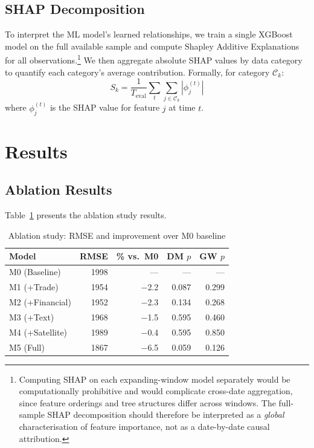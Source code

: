 \subsection{SHAP Decomposition}

To interpret the ML model's learned relationships, we train a single XGBoost model on the full available sample and compute Shapley Additive Explanations \citep{lundberg2017unified} for all observations.\footnote{Computing SHAP on each expanding-window model separately would be computationally prohibitive and would complicate cross-date aggregation, since feature orderings and tree structures differ across windows.  The full-sample SHAP decomposition should therefore be interpreted as a \emph{global} characterisation of feature importance, not as a date-by-date causal attribution.}  We then aggregate absolute SHAP values by data category to quantify each category's average contribution.  Formally, for category $\mathcal{C}_k$:
\[
  S_k = \frac{1}{T_{\text{eval}}} \sum_{t} \sum_{j \in \mathcal{C}_k} |\phi_j^{(t)}|
\]
where $\phi_j^{(t)}$ is the SHAP value for feature $j$ at time $t$.


\section{Results}
\label{sec:ch2_results}

\subsection{Ablation Results}

Table~\ref{tab:ch2_ablation_results} presents the ablation study results.

\begin{table}[htbp]
\centering
\caption{Ablation study: RMSE and improvement over M0 baseline}
\label{tab:ch2_ablation_results}
\begin{tabular}{@{} l r r r r @{}}
\toprule
{Model} & {RMSE} & {\% vs.\ M0} & {DM $p$} & {GW $p$} \\
\midrule
M0 (Baseline)  & 1998 &  {---} & {---}   & {---}  \\
M1 (+Trade)    & 1954 & $-$2.2 & 0.087 & 0.299 \\
M2 (+Financial)& 1952 & $-$2.3 & 0.134 & 0.268 \\
M3 (+Text)     & 1968 & $-$1.5 & 0.595 & 0.460 \\
M4 (+Satellite)& 1989 & $-$0.4 & 0.595 & 0.850 \\
M5 (Full)      & 1867 & $-$6.5 & 0.059 & 0.126 \\
\bottomrule
\end{tabular}
\end{table}


